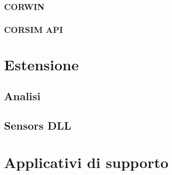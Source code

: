 \subsubsection{CORWIN}

\subsubsection{CORSIM API}

\section{Estensione}

\subsection{Analisi}

\subsection{Sensors DLL}

\section{Applicativi di supporto}
